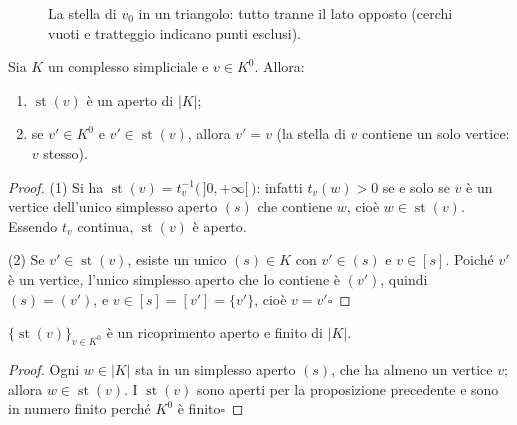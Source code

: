 \begin{figure}[H]
    \centering
    \caption{La stella di $v_0$ in un triangolo: tutto tranne il lato opposto (cerchi vuoti e tratteggio indicano punti esclusi).}
\end{figure}

\begin{prop}
Sia $K$ un complesso simpliciale e $v \in K^0$. Allora:
\begin{enumerate}
    \item[(1)] $\operatorname{st}(v)$ \`e un aperto di $|K|$;
    \item[(2)] se $v' \in K^0$ e $v' \in \operatorname{st}(v)$, allora $v' = v$ (la stella di $v$ contiene un solo vertice: $v$ stesso).
\end{enumerate}
\end{prop}
\begin{proof}
(1) Si ha $\operatorname{st}(v) = t_v^{-1}\big(\,]0, +\infty[\,\big)$: infatti $t_v(w) > 0$ se e solo se $v$ \`e un vertice dell'unico simplesso aperto $(s)$ che contiene $w$, cio\`e $w \in \operatorname{st}(v)$. Essendo $t_v$ continua, $\operatorname{st}(v)$ \`e aperto.

(2) Se $v' \in \operatorname{st}(v)$, esiste un unico $(s) \in K$ con $v' \in (s)$ e $v \in [s]$. Poich\'e $v'$ \`e un vertice, l'unico simplesso aperto che lo contiene \`e $(v')$, quindi $(s) = (v')$, e $v \in [s] = [v'] = \{v'\}$, cio\`e $v = v'$\hfill$\square$
\end{proof}

\begin{prop}
$\{ \operatorname{st}(v) \}_{v \in K^0}$ \`e un ricoprimento aperto e finito di $|K|$.
\end{prop}
\begin{proof}
Ogni $w \in |K|$ sta in un simplesso aperto $(s)$, che ha almeno un vertice $v$; allora $w \in \operatorname{st}(v)$. I $\operatorname{st}(v)$ sono aperti per la proposizione precedente e sono in numero finito perch\'e $K^0$ \`e finito\hfill$\square$
\end{proof}


